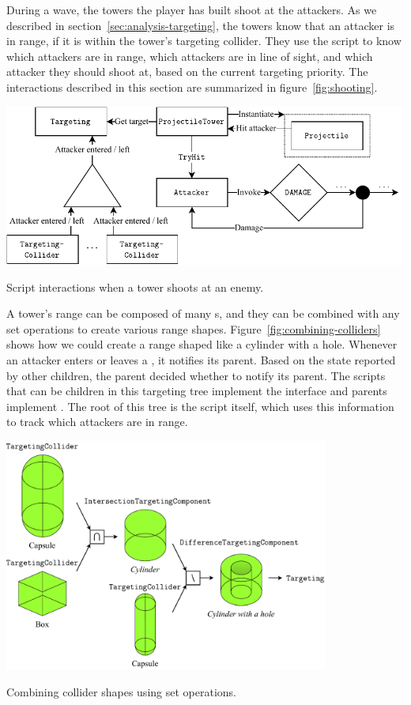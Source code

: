 During a wave, the towers the player has built shoot at the attackers.
As we described in section~\ref{sec:analysis-targeting}, the towers know that an attacker is in range, if it is within the tower's targeting collider.
They use the  script to know which attackers are in range, which attackers are in line of sight, and which attacker they should shoot at, based on the current targeting priority.
The interactions described in this section are summarized in figure~\ref{fig:shooting}.
\begin{center}
    \captionsetup{type=figure}
    \includegraphics[width=\textwidth]{img/shooting.pdf}
    \caption{Script interactions when a tower shoots at an enemy.}
    \label{fig:shooting}
\end{center}

A tower's range can be composed of many s, and they can be combined with any set operations to create various range shapes.
Figure~\ref{fig:combining-colliders} shows how we could create a range shaped like a cylinder with a hole.
Whenever an attacker enters or leaves a , it notifies its parent.
Based on the state reported by other children, the parent decided whether to notify its parent.
The scripts that can be children in this targeting tree implement the interface  and parents implement .
The root of this tree is the  script itself, which uses this information to track which attackers are in range.

\begin{center}
    \captionsetup{type=figure}
    \includegraphics[width=0.8\textwidth]{img/combining colliders.pdf}
    \caption{Combining collider shapes using set operations.}
    \label{fig:combining-colliders}
\end{center}

